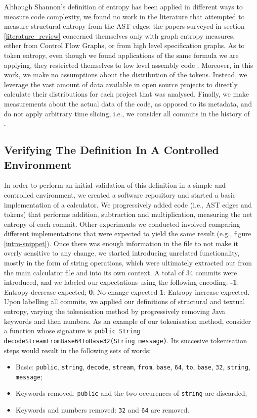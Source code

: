 \documentclass[10pt,conference]{IEEEtran}
\begin{document}
Although Shannon's definition of entropy has been applied in different ways to measure code complexity, we found no work in the literature that attempted to measure structural entropy from the AST edges; the papers surveyed in section \ref{literature_review} concerned themselves only with graph entropy measures, either from Control Flow Graphs, or from high level specification graphs. As to token entropy, even though we found applications of the same formula we are applying, they restricted themselves to low level assembly code \cite{cook1993information}. Moreover, in this work, we make no assumptions about the distribution of the tokens. Instead, we leverage the vast amount of data available in open source projects to directly calculate their distributions for each project that was analysed. Finally, we make measurements about the actual data of the code, as opposed to its metadata, and do not apply arbitrary time slicing, i.e., we consider all commits in the history of .

\subsection{Verifying The Definition In A Controlled Environment}
In order to perform an initial validation of this definition in a simple and controlled environment, we created a software repository and started a basic implementation of a calculator. We progressively added code (i.e., AST edges and tokens) that performs addition, subtraction and multiplication, measuring the net entropy of each commit. Other experiments we conducted involved comparing different implementations that were expected to yield the same result (e.g., figure \ref{intro-snippet}). Once there was enough information in the file to not make it overly sensitive to any change, we started introducing unrelated functionality, mostly in the form of string operations, which were ultimately extracted out from the main calculator file and into its own context. A total of 34 commits were introduced, and we labeled our expectations using the following encoding: \textbf{-1}: Entropy decrease expected; \textbf{0}: No change expected \textbf{1}: Entropy increase expected. Upon labelling all commits, we applied our definitions of structural and textual entropy, varying the tokenisation method by progressively removing Java keywords and then numbers. As an example of our tokenisation method, consider a function whose signature is \texttt{public String decodeStreamFromBase64ToBase32(String message)}. Its succesive tokenisation steps would result in the following sets of words:
\begin{itemize}
    \item Basic: \texttt{public}, \texttt{string}, \texttt{decode}, \texttt{stream}, \texttt{from}, \texttt{base}, \texttt{64}, \texttt{to}, \texttt{base}, \texttt{32}, \texttt{string}, \texttt{message};
    \item Keywords removed: \texttt{public} and the two occurences of \texttt{string} are discarded;
    \item Keywords and numbers removed: \texttt{32} and \texttt{64} are removed.
\end{itemize}
\end{document}
